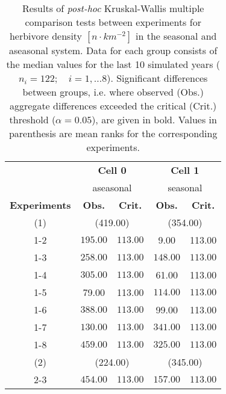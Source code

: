 \begin{table}[ht]
\centering
\small
\caption[Kruskal-Wallis multiple comparison of herbivore density.]{Results of \textit{post-hoc} Kruskal-Wallis multiple comparison
                            tests between experiments for herbivore density $[n\cdot km^{-2}]$ in the seasonal and aseasonal system.
                            Data for each group consists of the median values for the last 10 simulated years ($n_{i} = 122;\quad i = 1,\ldots8$).
                            Significant differences between groups, i.e. where observed (Obs.) aggregate differences exceeded the critical (Crit.) threshold ($\alpha = 0.05$), are given in bold. Values in parenthesis are mean ranks for the corresponding experiments.} 
\label{tab:chap:res:dyn:herbIND}
\begin{tabular*}{\textwidth}{@{\extracolsep{\fill} }ccccc}
  \toprule
& \multicolumn{2}{c}{\textbf{Cell 0}} & \multicolumn{2}{c}{\textbf{Cell 1}} \\
& \multicolumn{2}{c}{aseasonal} & \multicolumn{2}{c}{seasonal} \\
\cmidrule(lr){2-3} \cmidrule(lr){4-5}
\textbf{Experiments} & \textbf{Obs.} & \textbf{Crit.} & \textbf{Obs.} & \textbf{Crit.} \\
  \midrule
  (1) & \multicolumn{2}{c}{(419.00)} & \multicolumn{2}{c}{(354.00)} \\
1-2 & \(\mathbf{195.00}\) & \(\mathbf{113.00}\) & 9.00 & 113.00 \\ 
  1-3 & \(\mathbf{258.00}\) & \(\mathbf{113.00}\) & \(\mathbf{148.00}\) & \(\mathbf{113.00}\) \\ 
  1-4 & \(\mathbf{305.00}\) & \(\mathbf{113.00}\) & 61.00 & 113.00 \\ 
  1-5 & 79.00 & 113.00 & \(\mathbf{114.00}\) & \(\mathbf{113.00}\) \\ 
  1-6 & \(\mathbf{388.00}\) & \(\mathbf{113.00}\) & 99.00 & 113.00 \\ 
  1-7 & \(\mathbf{130.00}\) & \(\mathbf{113.00}\) & \(\mathbf{341.00}\) & \(\mathbf{113.00}\) \\ 
  1-8 & \(\mathbf{459.00}\) & \(\mathbf{113.00}\) & \(\mathbf{325.00}\) & \(\mathbf{113.00}\) \\ 
   [1ex]
(2) & \multicolumn{2}{c}{(224.00)} & \multicolumn{2}{c}{(345.00)} \\   
   2-3 & \(\mathbf{454.00}\) & \(\mathbf{113.00}\) & \(\mathbf{157.00}\) & \(\mathbf{113.00}\) \\ 

\end{tabular*}
\end{table}

